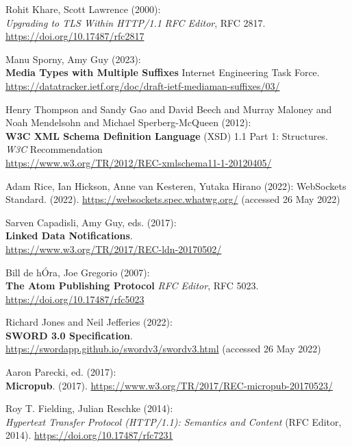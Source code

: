 \begin{thebibliography}{9}
{
Rohit Khare, Scott Lawrence (2000): \\
\emph{Upgrading to {TLS Within HTTP}/1.1}
\emph{RFC Editor}, RFC 2817.
\url{https://doi.org/10.17487/rfc2817}

Manu Sporny, Amy Guy (2023): \\
\textbf{{Media Types with Multiple Suffixes}} 
Internet Engineering Task Force.
\url{https://datatracker.ietf.org/doc/draft-ietf-mediaman-suffixes/03/}

Henry Thompson and Sandy Gao and David Beech and Murray Maloney and Noah Mendelsohn and Michael Sperberg-McQueen (2012):\\
\textbf{W3C XML Schema Definition Language} ({XSD}) 1.1 {Part} 1: {Structures}. \\
\emph{W3C} Recommendation\\
\url{https://www.w3.org/TR/2012/REC-xmlschema11-1-20120405/}

Adam Rice, Ian Hickson, Anne van Kesteren, Yutaka Hirano (2022):
{WebSockets Standard}. (2022). \url{https://websockets.spec.whatwg.org/}
(accessed 26 May 2022)

Sarven Capadisli, Amy Guy, eds. (2017): \\
\textbf{Linked Data Notifications}.\\
\url{https://www.w3.org/TR/2017/REC-ldn-20170502/}

Bill de hÓra, Joe Gregorio (2007): \\
\textbf{The {Atom Publishing Protocol}} 
\emph{RFC Editor}, RFC 5023.
\url{https://doi.org/10.17487/rfc5023}

Richard Jones and Neil Jefferies (2022): \\
\textbf{SWORD 3.0 Specification}. \\
\url{https://swordapp.github.io/swordv3/swordv3.html} (accessed 26 May
2022)

Aaron Parecki, ed. (2017): \\
\textbf{Micropub}. (2017).
\url{https://www.w3.org/TR/2017/REC-micropub-20170523/}

Roy T. Fielding, Julian Reschke (2014): \\
\emph{Hypertext {Transfer Protocol} ({HTTP}/1.1): {Semantics} and {Content}} ({RFC Editor}, 2014).
\url{https://doi.org/10.17487/rfc7231}

}
\end{thebibliography}
